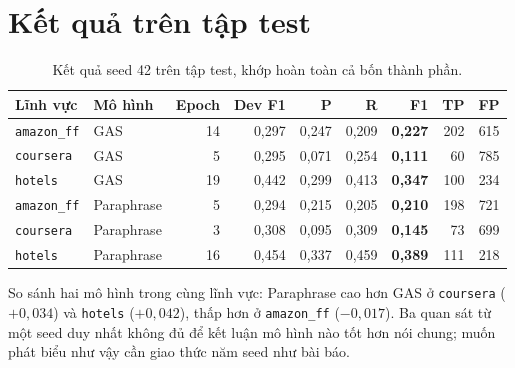 \documentclass[12pt,a4paper]{report}
\newcommand{\code}[1]{\texttt{#1}}
\begin{document}
\section{Kết quả trên tập test}

\begin{table}[H]
\centering
\caption{Kết quả seed 42 trên tập test, khớp hoàn toàn cả bốn thành phần.}
\label{tab:ketqua}
\begin{tabular}{llrrrrrrr}
\toprule
\textbf{Lĩnh vực} & \textbf{Mô hình} & \textbf{Epoch} & \textbf{Dev F1} & \textbf{P} & \textbf{R} & \textbf{F1} & \textbf{TP} & \textbf{FP} \\
\midrule
\code{amazon\_ff} & GAS        & 14 & 0,297 & 0,247 & 0,209 & \textbf{0,227} & 202 & 615 \\
\code{coursera}   & GAS        & 5  & 0,295 & 0,071 & 0,254 & \textbf{0,111} & 60  & 785 \\
\code{hotels}     & GAS        & 19 & 0,442 & 0,299 & 0,413 & \textbf{0,347} & 100 & 234 \\
\code{amazon\_ff} & Paraphrase & 5  & 0,294 & 0,215 & 0,205 & \textbf{0,210} & 198 & 721 \\
\code{coursera}   & Paraphrase & 3  & 0,308 & 0,095 & 0,309 & \textbf{0,145} & 73  & 699 \\
\code{hotels}     & Paraphrase & 16 & 0,454 & 0,337 & 0,459 & \textbf{0,389} & 111 & 218 \\
\bottomrule
\end{tabular}
\end{table}

So sánh hai mô hình trong cùng lĩnh vực: Paraphrase cao hơn GAS ở \code{coursera} ($+0{,}034$) và \code{hotels}
($+0{,}042$), thấp hơn ở \code{amazon\_ff} ($-0{,}017$). Ba quan sát từ một seed duy nhất không đủ để kết luận mô hình
nào tốt hơn nói chung; muốn phát biểu như vậy cần giao thức năm seed như bài báo.
\end{document}
